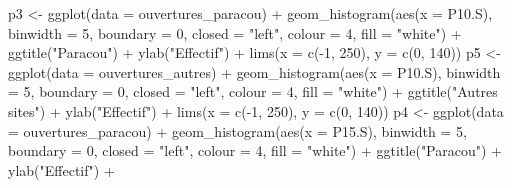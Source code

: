 \documentclass[
  12pt,
  american,
  a4paper,
  extrafontsizes,onecolumn,openright
  ]{memoir}
\newenvironment{Shaded}{\begin{snugshade}}{\end{snugshade}}
\newcommand{\AttributeTok}[1]{\textcolor[rgb]{0.77,0.63,0.00}{#1}}
\newcommand{\DecValTok}[1]{\textcolor[rgb]{0.00,0.00,0.81}{#1}}
\newcommand{\FunctionTok}[1]{\textcolor[rgb]{0.00,0.00,0.00}{#1}}
\newcommand{\NormalTok}[1]{#1}
\newcommand{\OtherTok}[1]{\textcolor[rgb]{0.56,0.35,0.01}{#1}}
\newcommand{\SpecialCharTok}[1]{\textcolor[rgb]{0.00,0.00,0.00}{#1}}
\newcommand{\StringTok}[1]{\textcolor[rgb]{0.31,0.60,0.02}{#1}}
\begin{document}
\begin{Shaded}
\begin{Highlighting}[]
\NormalTok{p3 }\OtherTok{\textless{}{-}} \FunctionTok{ggplot}\NormalTok{(}\AttributeTok{data =}\NormalTok{ ouvertures\_paracou) }\SpecialCharTok{+} \FunctionTok{geom\_histogram}\NormalTok{(}\FunctionTok{aes}\NormalTok{(}\AttributeTok{x =}\NormalTok{ P10.S),}
    \AttributeTok{binwidth =} \DecValTok{5}\NormalTok{, }\AttributeTok{boundary =} \DecValTok{0}\NormalTok{, }\AttributeTok{closed =} \StringTok{"left"}\NormalTok{, }\AttributeTok{colour =} \DecValTok{4}\NormalTok{,}
    \AttributeTok{fill =} \StringTok{"white"}\NormalTok{) }\SpecialCharTok{+} \FunctionTok{ggtitle}\NormalTok{(}\StringTok{"Paracou"}\NormalTok{) }\SpecialCharTok{+} \FunctionTok{ylab}\NormalTok{(}\StringTok{"Effectif"}\NormalTok{) }\SpecialCharTok{+}
    \FunctionTok{lims}\NormalTok{(}\AttributeTok{x =} \FunctionTok{c}\NormalTok{(}\SpecialCharTok{{-}}\DecValTok{1}\NormalTok{, }\DecValTok{250}\NormalTok{), }\AttributeTok{y =} \FunctionTok{c}\NormalTok{(}\DecValTok{0}\NormalTok{, }\DecValTok{140}\NormalTok{))}
\NormalTok{p5 }\OtherTok{\textless{}{-}} \FunctionTok{ggplot}\NormalTok{(}\AttributeTok{data =}\NormalTok{ ouvertures\_autres) }\SpecialCharTok{+} \FunctionTok{geom\_histogram}\NormalTok{(}\FunctionTok{aes}\NormalTok{(}\AttributeTok{x =}\NormalTok{ P10.S),}
    \AttributeTok{binwidth =} \DecValTok{5}\NormalTok{, }\AttributeTok{boundary =} \DecValTok{0}\NormalTok{, }\AttributeTok{closed =} \StringTok{"left"}\NormalTok{, }\AttributeTok{colour =} \DecValTok{4}\NormalTok{,}
    \AttributeTok{fill =} \StringTok{"white"}\NormalTok{) }\SpecialCharTok{+} \FunctionTok{ggtitle}\NormalTok{(}\StringTok{"Autres sites"}\NormalTok{) }\SpecialCharTok{+} \FunctionTok{ylab}\NormalTok{(}\StringTok{"Effectif"}\NormalTok{) }\SpecialCharTok{+}
    \FunctionTok{lims}\NormalTok{(}\AttributeTok{x =} \FunctionTok{c}\NormalTok{(}\SpecialCharTok{{-}}\DecValTok{1}\NormalTok{, }\DecValTok{250}\NormalTok{), }\AttributeTok{y =} \FunctionTok{c}\NormalTok{(}\DecValTok{0}\NormalTok{, }\DecValTok{140}\NormalTok{))}
\NormalTok{p4 }\OtherTok{\textless{}{-}} \FunctionTok{ggplot}\NormalTok{(}\AttributeTok{data =}\NormalTok{ ouvertures\_paracou) }\SpecialCharTok{+} \FunctionTok{geom\_histogram}\NormalTok{(}\FunctionTok{aes}\NormalTok{(}\AttributeTok{x =}\NormalTok{ P15.S),}
    \AttributeTok{binwidth =} \DecValTok{5}\NormalTok{, }\AttributeTok{boundary =} \DecValTok{0}\NormalTok{, }\AttributeTok{closed =} \StringTok{"left"}\NormalTok{, }\AttributeTok{colour =} \DecValTok{4}\NormalTok{,}
    \AttributeTok{fill =} \StringTok{"white"}\NormalTok{) }\SpecialCharTok{+} \FunctionTok{ggtitle}\NormalTok{(}\StringTok{"Paracou"}\NormalTok{) }\SpecialCharTok{+} \FunctionTok{ylab}\NormalTok{(}\StringTok{"Effectif"}\NormalTok{) }\SpecialCharTok{+}

\end{Highlighting}
\end{Shaded}
\end{document}
